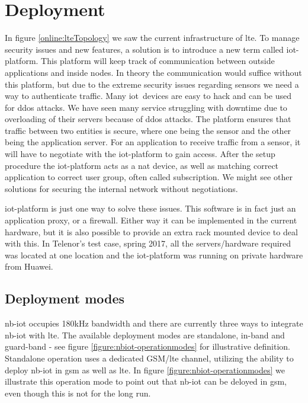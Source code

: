 \documentclass[USenglish]{ifimaster}  %
\begin{document}
\section{Deployment} \label{section:nb-iot-deployment} %
In figure \vref{online:lteTopology} we saw the current infrastructure of \acrshort{lte}. To manage security issues and new features, a solution is to introduce a new term called \acrfull{iot-platform}. This platform will keep track of communication between outside applications and inside nodes. In theory the communication would suffice without this platform, but due to the extreme security issues regarding sensors we need a way to authenticate traffic. Many \acrshort{iot} devices are easy to hack and can be used for \acrfull{ddos} attacks. We have seen many service struggling with downtime due to overloading of their servers because of \acrshort{ddos} attacks. The platform ensures that traffic between two entities is secure, where one being the sensor and the other being the application server. For an application to receive traffic from a sensor, it will have to negotiate with the \acrshort{iot-platform} to gain access. After the setup procedure the \acrshort{iot-platform} acts as a \acrshort{nat} device, as well as matching correct application to correct user group, often called subscription. We might see other solutions for securing the internal network without negotiations.

\acrshort{iot-platform} is just one way to solve these issues. This software is in fact just an application proxy, or a firewall. Either way it can be implemented in the current hardware, but it is also possible to provide an extra rack mounted device to deal with this. In Telenor's test case, spring 2017, all the servers/hardware required was located at one location and the \acrshort{iot-platform} was running on private hardware from Huawei.

\subsection{Deployment modes} \label{ssection:operationmodes}
\acrshort{nb-iot} occupies 180kHz bandwidth and there are currently three ways to integrate \acrshort{nb-iot} with \acrshort{lte}. The available deployment modes are standalone, in-band and guard-band - see figure \vref{figure:nbiot-operationmodes} for illustrative definition. Standalone operation uses a dedicated GSM/\acrshort{lte} channel, utilizing the ability to deploy \acrshort{nb-iot} in \acrshort{gsm} as well as \acrshort{lte}. In figure \vref{figure:nbiot-operationmodes} we illustrate this operation mode to point out that \acrshort{nb-iot} can be deloyed in \acrshort{gsm}, even though this is not for the long run.
\end{document}
